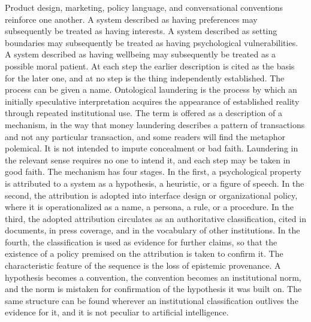 \documentclass[12pt]{article}
\theoremstyle{definition}
\begin{document}
Product design, marketing, policy language, and conversational conventions reinforce one another. A system described as having preferences may subsequently be treated as having interests. A system described as setting boundaries may subsequently be treated as having psychological vulnerabilities. A system described as having wellbeing may subsequently be treated as a possible moral patient. At each step the earlier description is cited as the basis for the later one, and at no step is the thing independently established. The process can be given a name. Ontological laundering is the process by which an initially speculative interpretation acquires the appearance of established reality through repeated institutional use. The term is offered as a description of a mechanism, in the way that money laundering describes a pattern of transactions and not any particular transaction, and some readers will find the metaphor polemical. It is not intended to impute concealment or bad faith. Laundering in the relevant sense requires no one to intend it, and each step may be taken in good faith. The mechanism has four stages. In the first, a psychological property is attributed to a system as a hypothesis, a heuristic, or a figure of speech. In the second, the attribution is adopted into interface design or organizational policy, where it is operationalized as a name, a persona, a rule, or a procedure. In the third, the adopted attribution circulates as an authoritative classification, cited in documents, in press coverage, and in the vocabulary of other institutions. In the fourth, the classification is used as evidence for further claims, so that the existence of a policy premised on the attribution is taken to confirm it. The characteristic feature of the sequence is the loss of epistemic provenance. A hypothesis becomes a convention, the convention becomes an institutional norm, and the norm is mistaken for confirmation of the hypothesis it was built on. The same structure can be found wherever an institutional classification outlives the evidence for it, and it is not peculiar to artificial intelligence.
\end{document}
